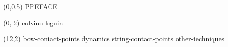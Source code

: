 \documentclass[10pt]{article}
\begin{document}
\begin{textblock}{23}(0,0.5)
\center\huge PREFACE
\end{textblock}

\begin{textblock}{11}(0, 2)
    {calvino}
    {leguin}
\end{textblock}

\begin{textblock}{11}(12,2)
    {bow-contact-points}
    {dynamics}
    {string-contact-points}
    {other-techniques}
\end{textblock}
\end{document}
